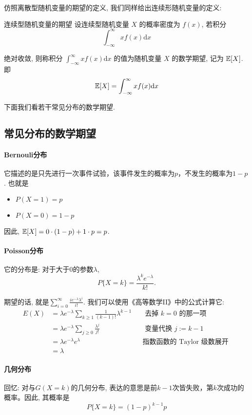     
    仿照离散型随机变量的期望的定义, 我们同样给出连续形随机变量的定义:
    \begin{definition}{连续型随机变量的期望}
        设连续型随机变量 $X$ 的概率密度为 $f(x)$, 若积分
$$
\int_{-\infty}^{\infty} x f(x) \mathrm{d} x
$$

绝对收敛, 则称积分 $\int_{-\infty}^{\infty} x f(x) \mathrm{d} x$ 的值为随机变量 $X$ 的数学期望, 记为 $\mathbb E[X]$.即
$$
\mathbb E[X]=\int_{-\infty}^{\infty} x f(x) \mathrm{d} x
$$
    \end{definition}

    下面我们看若干常见分布的数学期望. 

    \subsection{常见分布的数学期望}

    \paragraph{Bernouli分布} 它描述的是只先进行一次事件试验，该事件发生的概率为$p$，不发生的概率为$1-p$. 也就是
    \begin{itemize}
        \item $P(X=1)=p$
        \item $P(X=0)=1-p$
    \end{itemize}

    因此, $ \mathbb E[X]=0 \cdot(1-p)+1 \cdot p=p$.

    \paragraph{Poisson分布} 它的分布是: 对于大于0的参数$\lambda$, $$
    P\{X=k\}=\frac{\lambda^k e^{-\lambda}}{k !}. 
    $$    

    期望的话, 就是$\sum_{i=0}^{\infty} \frac{i e^{-\lambda} \lambda^i}{i !}$. 我们可以使用《高等数学II》中的公式计算它: 
    $$
\begin{aligned}
{E}(X) & =\lambda e^{-\lambda} \sum_{k \geq 1} \frac{1}{(k-1) !} \lambda^{k-1} & & \text { 去掉 } k=0 \text { 的那一项 } \\
& =\lambda e^{-\lambda} \sum_{j \geq 0} \frac{\lambda^j}{j !} & & \text { 变量代换 } j:=k-1 \\
& =\lambda e^{-\lambda} e^\lambda & & \text {指数函数的 Taylor 级数展开 } \\
& =\lambda & &
\end{aligned}
$$

\paragraph{几何分布}
回忆: 对与$G(X=k)$的几何分布, 表达的意思是前$k-1$次皆失败，第$k$次成功的概率。因此, 其概率是
    $$
    P\{X=k\}=(1-p)^{k-1} p
    $$

